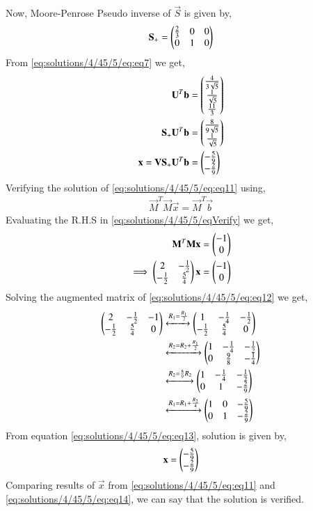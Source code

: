 Now, Moore-Penrose Pseudo inverse of $\vec{S}$ is given by,
\begin{align}
\mathbf{S_+} = \begin{pmatrix}\frac{2}{3}&0&0\\0&1&0\end{pmatrix}
\end{align}
From \eqref{eq:solutions/4/45/5/eq:eq7} we get,
\begin{align}
\mathbf{U}^T\mathbf{b}&=\begin{pmatrix}\frac{4}{3\sqrt{5}}\\\frac{1}{\sqrt{5}}\\\frac{11}{3}\end{pmatrix}\\
\mathbf{S_+}\mathbf{U}^T\mathbf{b}&=\begin{pmatrix}\frac{8}{9\sqrt{5}}\\\frac{1}{\sqrt{5}}\end{pmatrix}\\
\mathbf{x} = \mathbf{V}\mathbf{S_+}\mathbf{U}^T\mathbf{b} &= \begin{pmatrix}-\frac{5}{9}\\-\frac{2}{9}\end{pmatrix} \label{eq:solutions/4/45/5/eq:eq11}
\end{align}
Verifying the solution of \eqref{eq:solutions/4/45/5/eq:eq11} using,
\begin{align}
\vec{M}^T\vec{M}\vec{x} = \vec{M}^T\vec{b}\label{eq:solutions/4/45/5/eqVerify}
\end{align}
Evaluating the R.H.S in \eqref{eq:solutions/4/45/5/eqVerify} we get,
\begin{align}
\mathbf{M}^T\mathbf{M}\mathbf{x} &= \begin{pmatrix}-1\\0\end{pmatrix}\\
\implies\begin{pmatrix}2&-\frac{1}{2}\\-\frac{1}{2}&\frac{5}{4}\end{pmatrix}\mathbf{x} &= \begin{pmatrix}-1\\0\end{pmatrix}\label{eq:solutions/4/45/5/eq:eq12}
\end{align}
Solving the augmented matrix of \eqref{eq:solutions/4/45/5/eq:eq12} we get,
\begin{align}
\begin{pmatrix}2&-\frac{1}{2}&-1\\-\frac{1}{2}&\frac{5}{4}&0\end{pmatrix} &\xleftrightarrow{R_1=\frac{R_1}{2}}\begin{pmatrix}1&-\frac{1}{4}&-\frac{1}{2}\\-\frac{1}{2}&\frac{5}{4}&0\end{pmatrix}\\
&\xleftrightarrow{R_2=R_2+\frac{R_1}{2}}\begin{pmatrix}1&-\frac{1}{4}&-\frac{1}{2}\\0&\frac{9}{8}&-\frac{1}{4}\end{pmatrix}\\
&\xleftrightarrow{R_2=\frac{8}{9}R_2}\begin{pmatrix}1&-\frac{1}{4}&-\frac{1}{2}\\0&1&-\frac{2}{9}\end{pmatrix}\\
&\xleftrightarrow{R_1=R_1+\frac{R_2}{4}}\begin{pmatrix}1&0&-\frac{5}{9}\\0&1&-\frac{2}{9}\end{pmatrix}\label{eq:solutions/4/45/5/eq:eq13}
\end{align}
From equation \eqref{eq:solutions/4/45/5/eq:eq13}, solution is given by,
\begin{align}
\mathbf{x}=\begin{pmatrix}-\frac{5}{9}\\-\frac{2}{9}\end{pmatrix}\label{eq:solutions/4/45/5/eq:eq14}
\end{align}
Comparing results of $\vec{x}$ from \eqref{eq:solutions/4/45/5/eq:eq11} and \eqref{eq:solutions/4/45/5/eq:eq14}, we can say that the solution is verified.
